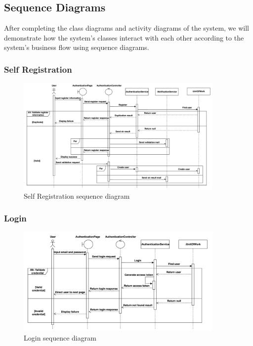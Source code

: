 \subsection{Sequence Diagrams}

After completing the class diagrams and activity diagrams of the system, we will  demonstrate how the system's classes interact with each other according to the system's business flow using sequence diagrams.

\subsubsection{Self Registration}

\begin{figure}[H]
    \centering
    \includegraphics[width=0.9\textwidth]{Figures/self_register_seq.png}
    \caption{Self Registration sequence diagram}
    \label{fig:self-registration-seq}
\end{figure}


\subsubsection{Login}

\begin{figure}[H]
    \centering
    \includegraphics[width=0.9\textwidth]{Figures/login_seq.png}
    \caption{Login sequence diagram}
    \label{fig:login-seq}
\end{figure}
\clearpage
